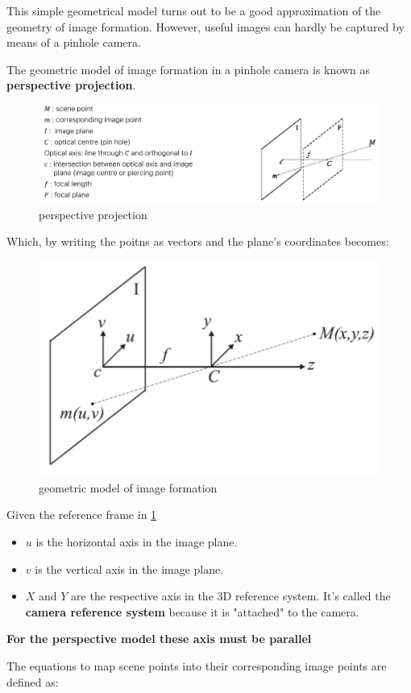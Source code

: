 \documentclass{article}
\begin{document}
This simple geometrical model turns out to be a good approximation of the geometry of image formation.
However, useful images can hardly be captured by means of a pinhole camera.

The geometric model of image formation in a pinhole camera is known as \textbf{perspective projection}.

\begin{figure}[htbp]
  \centering
  \includegraphics[width=0.9\linewidth]{./img/perspective_projection.jpg}
  \caption{perspective projection}
\end{figure}

Which, by writing the poitns as vectors and the plane's coordinates becomes:

\begin{figure}[htbp]
  \centering
  \includegraphics[width=0.45\linewidth]{./img/perspective_projection_axis.jpg}
  \caption{geometric model of image formation}
  \label{fig:perspective_projection_axis}
\end{figure}

Given the reference frame in \ref{fig:perspective_projection_axis} 
\begin{itemize}
  \item $u$ is the horizontal axis in the image plane.
  \item $v$ is the vertical axis in the image plane.
  \item $X$ and $Y$ are the respective axis in the 3D reference system. It's called the \textbf{camera reference system} because it is "attached" to the camera.
\end{itemize}

\textbf{For the perspective model these axis must be parallel}

The equations to map scene points into their corresponding image points are defined as:
\end{document}
